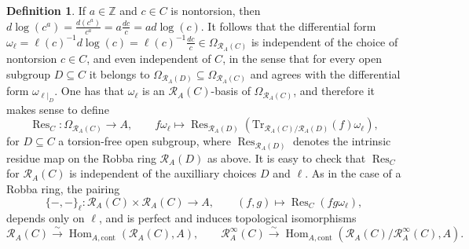 \documentclass[12pt]{article}
\theoremstyle{definition}
\newtheorem{defn}[theorem]{Definition}
\numberwithin{equation}{theorem}
\newcommand{\calR}{\mathcal{R}}
\newcommand{\ZZ}{\mathbb{Z}}
\newcommand{\cont}{\mathrm{cont}}
\newcommand{\Tr}{\mathrm{Tr}}
\DeclareMathOperator{\Hom}{Hom}
\DeclareMathOperator{\Res}{Res}
\begin{document}
\begin{defn}
If $a \in \ZZ$ and $c \in C$ is nontorsion, then $d\log(c^a) =
\frac{d(c^a)}{c^a} = a\frac{dc}c = ad\log(c)$.  It follows that the
differential form $\omega_\ell = \ell(c)^{-1}d\log(c) =
\ell(c)^{-1}\frac{dc}{c} \in \Omega_{\calR_A(C)}$ is independent of
the choice of nontorsion $c \in C$, and even independent of $C$, in
the sense that for every open subgroup $D \subseteq C$ it belongs to
$\Omega_{\calR_A(D)} \subseteq \Omega_{\calR_A(C)}$ and agrees with
the differential form $\omega_{\ell|_D}$.  One has that $\omega_\ell$
is an $\calR_A(C)$-basis of $\Omega_{\calR_A(C)}$, and therefore it
makes sense to define
\[
\Res_C: \Omega_{\calR_A(C)} \to A,
\qquad
f\omega_\ell \mapsto
   \Res_{\calR_A(D)}(\Tr_{\calR_A(C)/\calR_A(D)}(f)\omega_\ell),
\]
for $D \subseteq C$ a torsion-free open subgroup, where
$\Res_{\calR_A(D)}$ denotes the intrinsic residue map on the Robba
ring $\calR_A(D)$ as above.  It is easy to check that $\Res_C$ for
$\calR_A(C)$ is independent of the auxilliary choices $D$ and $\ell$.
As in the case of a Robba ring, the pairing
\[
\{-,-\}_\ell: \calR_A(C) \times \calR_A(C) \to A,
\qquad
(f,g) \mapsto \Res_C(fg\omega_\ell),
\]
depends only on $\ell$, and is perfect and induces topological
isomorphisms
\begin{equation}\label{E:gamma residue pairing}
\calR_A(C) \stackrel\sim\to \Hom_{A,\cont}(\calR_A(C),A),
\qquad
\calR_A^\infty(C) \stackrel\sim\to \Hom_{A,\cont}(\calR_A(C)/\calR_A^\infty(C),A).
\end{equation}
\end{defn}
\end{document}
